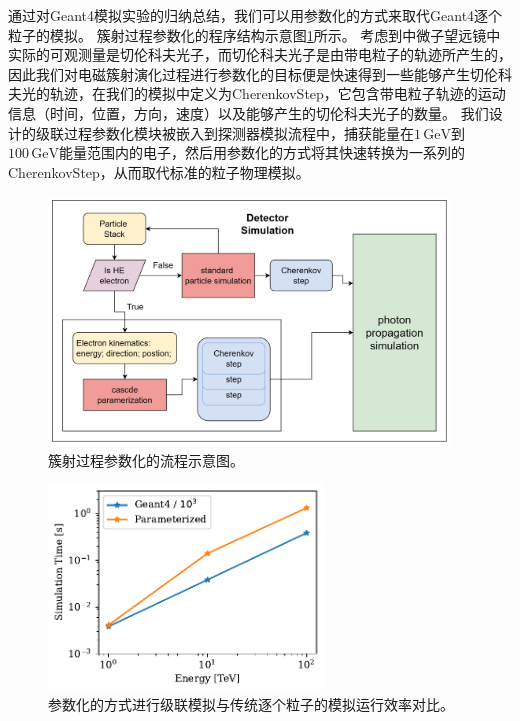 通过对Geant4模拟实验的归纳总结，我们可以用参数化的方式来取代Geant4逐个粒子的模拟。
簇射过程参数化的程序结构示意图\ref{fig:param_flow_chart}所示。
考虑到中微子望远镜中实际的可观测量是切伦科夫光子，而切伦科夫光子是由带电粒子的轨迹所产生的，因此我们对电磁簇射演化过程进行参数化的目标便是快速得到一些能够产生切伦科夫光的轨迹，在我们的模拟中定义为\textsf{CherenkovStep}，它包含带电粒子轨迹的运动信息（时间，位置，方向，速度）以及能够产生的切伦科夫光子的数量。
我们设计的级联过程参数化模块被嵌入到探测器模拟流程中，捕获能量在$1\,\mathrm{GeV}$到$100\,\mathrm{GeV}$能量范围内的电子，然后用参数化的方式将其快速转换为一系列的\textsf{CherenkovStep}，从而取代标准的粒子物理模拟。

\begin{figure}[!ht]
\centering
    \includegraphics[width=0.95\textwidth]{img/param_flow_chart.jpg}
    \caption{簇射过程参数化的流程示意图。}
    \label{fig:param_flow_chart}
\end{figure}

\begin{figure}[!ht]
\centering
    \includegraphics[width=0.65\textwidth]{img/performance_param.pdf}
    \caption{参数化的方式进行级联模拟与传统逐个粒子的模拟运行效率对比。}
    \label{fig:performance_param}
\end{figure}

